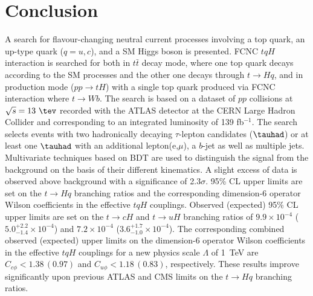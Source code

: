 \documentclass[PAPER, coverpage, atlasdraft=true, texlive=2016, UKenglish]{\ATLASLATEXPATH atlasdoc}
\begin{document}
\section{Conclusion}
\label{sec:conclusion}
A search for flavour-changing neutral current processes involving a top quark, an up-type quark ($q=u, c$), and a SM Higgs boson is presented. FCNC $tqH$ interaction is searched for both in $t\bar{t}$ decay mode, where one top quark decays according to the SM processes and the other one decays through $t\rightarrow Hq$, and in production mode ($pp\rightarrow tH$) with a single top quark produced via FCNC interaction where $t\to Wb$. The search is based on a dataset of $pp$ collisions at $\sqrt{s}=13~\tev$ recorded with the ATLAS detector at the CERN Large Hadron Collider and corresponding to an integrated luminosity of 139 fb$^{-1}$. The search selects events with two hadronically decaying $\tau$-lepton candidates ($\tauhad$) or at least one $\tauhad$ with an additional lepton(e,$\mu$), a $b$-jet as well as multiple jets. Multivariate techniques based on BDT are used to distinguish the signal from the background on the basis of their different kinematics.
A slight excess of data is observed above background with a significance of 2.3$\sigma$.  
95\% CL upper limits are set on the $t\to Hq$ branching ratios and the corresponding
dimension-6 operator Wilson coefficients in the effective $tqH$ couplings. 
Observed (expected) 95\% CL upper limits are set on the $t\to cH$ and $t\to uH$ branching ratios of $9.9\times10^{-4}$ ($5.0^{+2.2}_{-1.4}\times10^{-4}$) and $7.2\times10^{-4}$ ($3.6^{+1.7}_{-1.0}\times10^{-4}$).
The corresponding combined observed (expected) upper limits on the dimension-6 operator Wilson coefficients in
the effective $tqH$ couplings for a new physics scale $\Lambda$ of 1~TeV are $C_{c\phi} <1.38\, (0.97)$ and $C_{u\phi} <1.18\, (0.83)$, respectively.
These results improve significantly upon previous ATLAS and CMS limits on the $t\rightarrow Hq$ branching ratios.
\end{document}
